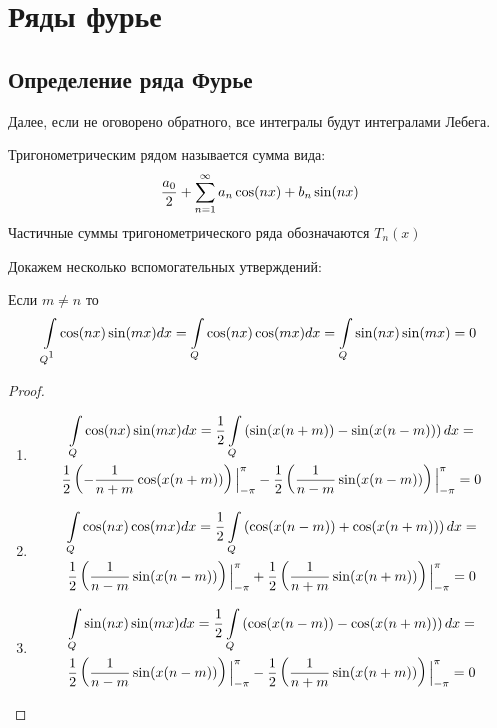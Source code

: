 \section{Ряды фурье}

\subsection{Определение ряда Фурье}

Далее, если не оговорено обратного, все интегралы будут интегралами Лебега.
\begin{definition}
	Тригонометрическим рядом называется сумма вида:
	\begin{gather*}
		\frac{a_0}{2} + \sum\limits_{n = 1}^{\infty} a_n \cos(nx) + b_n \sin(nx)
	\end{gather*}
	Частичные суммы тригонометрического ряда обозначаются $T_n(x)$
\end{definition}

Докажем несколько вспомогательных утверждений:
\begin{statement}
	Если $m \neq  n$ то
\begin{gather*}
	\intl{Q\footnotemark}\cos(nx)\sin(mx)dx = \intl{Q}\cos(nx)\cos(mx)dx = \intl{Q}\sin(nx)\sin(mx) = 0
\end{gather*}
\end{statement}
	
\begin{proof}
	\begin{enumerate}
		\item 
			\begin{gather*}
				\int\limits_{Q}\cos(nx)\sin(mx)dx = 
				\frac{1}{2}\int\limits_{Q}\left( \sin(x(n + m)) - \sin(x(n - m))\right) dx =\\
				\frac{1}{2}\left( -\frac{1}{n + m}\cos(x(n + m))\right)\Big|_{-\pi}^{\pi} -
				\frac{1}{2}\left( \frac{1}{n - m}\sin(x(n - m))\right)\Big|_{-\pi}^{\pi} = 0
			\end{gather*}
		\item
			\begin{gather*}
				\int\limits_{Q}\cos(nx)\cos(mx)dx = 
				\frac{1}{2}\int\limits_{Q}\left( \cos(x(n - m)) + \cos(x(n + m))\right) dx =\\
				\frac{1}{2}\left( \frac{1}{n - m}\sin(x(n - m))\right)\Big|_{-\pi}^{\pi} +
				\frac{1}{2}\left( \frac{1}{n + m}\sin(x(n + m))\right)\Big|_{-\pi}^{\pi} = 0
			\end{gather*}
		\item
			\begin{gather*}
				\int\limits_{Q}\sin(nx)\sin(mx)dx = 
				\frac{1}{2}\int\limits_{Q}\left( \cos(x(n - m)) - \cos(x(n + m))\right) dx =\\
				\frac{1}{2}\left( \frac{1}{n - m}\sin(x(n - m))\right)\Big|_{-\pi}^{\pi} -
				\frac{1}{2}\left( \frac{1}{n + m}\sin(x(n + m))\right)\Big|_{-\pi}^{\pi} = 0
			\end{gather*}		
	\end{enumerate}
\end{proof}

